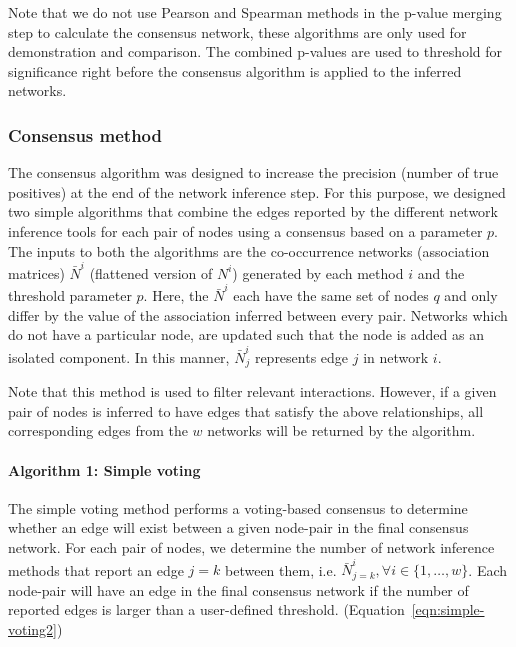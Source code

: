   Note that we do not use Pearson and Spearman methods in the p-value merging step to calculate the consensus network, these algorithms are only used for demonstration and comparison.
  The combined p-values are used to threshold for significance right before the consensus algorithm is applied to the inferred networks.

  \subsubsection*{Consensus method}
  \vspace{-5mm}

  The consensus algorithm was designed to increase the precision (number of true positives) at the end of the network inference step.
  For this purpose, we designed two simple algorithms that combine the edges reported by the different network inference tools for each pair of nodes using a consensus based on a parameter $p$.
  The inputs to both the algorithms are the co-occurrence networks (association matrices) $\bar{N}^i$ (flattened version of $N^{i}$) generated by each method $i$ and the threshold parameter $p$.
  Here, the $\bar{N}^{i}$ each have the same set of nodes $q$ and only differ by the value of the association inferred between every pair.
  Networks which do not have a particular node, are updated such that the node is added as an isolated component.
  In this manner, $\bar{N}^{i}_j$ represents edge $j$ in network $i$.

    Note that this method is used to filter relevant interactions. However, if a given pair of nodes is inferred to have edges that satisfy the above relationships, all corresponding edges from the $w$ networks will be returned by the algorithm.

  \paragraph*{Algorithm 1: Simple voting}
  The simple voting method performs a voting-based consensus to determine whether an edge will exist between a given node-pair in the final consensus network.
  For each pair of nodes, we determine the number of network inference methods that report an edge $j=k$ between them, i.e. $\bar{N}^{i}_{j=k}, \forall i \in \{1,\dots,w\}$.
  Each node-pair will have an edge in the final consensus network if the number of reported edges is larger than a user-defined threshold.
  (Equation~\ref{eqn:simple-voting2})

